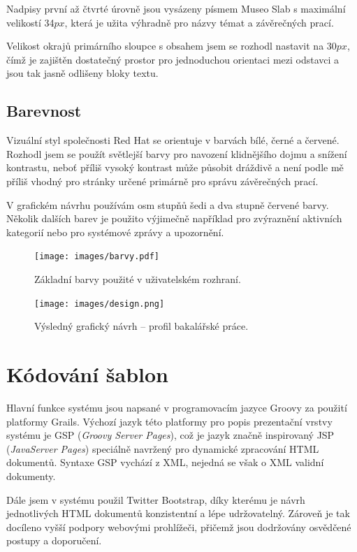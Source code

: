 Nadpisy první až čtvrté úrovně jsou vysázeny písmem Museo Slab s maximální velikostí 34$px$, která je užita výhradně pro názvy témat a závěrečných prací.

Velikost okrajů primárního sloupce s obsahem jsem se rozhodl nastavit na 30$px$, čímž je zajištěn dostatečný prostor pro jednoduchou orientaci mezi odstavci a jsou tak jasně odlišeny bloky textu.

\subsection{Barevnost}

Vizuální styl společnosti Red Hat se orientuje v barvách bílé, černé a červené. Rozhodl jsem se použít světlejší barvy pro navození klidnějšího dojmu a snížení kontrastu, neboť příliš vysoký kontrast může působit dráždivě a není podle mě příliš vhodný pro stránky určené primárně pro správu závěrečných prací.

V grafickém návrhu používám osm stupňů šedi a dva stupně červené barvy. Několik dalších barev je použito výjimečně například pro zvýraznění aktivních kategorií nebo pro systémové zprávy a upozornění.

\begin{figure}[htbp]
    \centering
    \texttt{[image: images/barvy.pdf]}
    \caption{Základní barvy použité v uživatelském rozhraní.}
    \label{img:colors}
\end{figure}

\begin{figure}[htbp]
    \centering
    \texttt{[image: images/design.png]}
    \caption{Výsledný grafický návrh -- profil bakalářské práce.}
    \label{img:design}
\end{figure}

\section{Kódování šablon}

Hlavní funkce systému jsou napsané v programovacím jazyce Groovy za použití platformy Grails. Výchozí jazyk této platformy pro popis prezentační vrstvy systému je GSP (\textit{Groovy Server Pages}), což je jazyk značně inspirovaný JSP (\textit{JavaServer Pages}) speciálně navržený pro dynamické zpracování HTML dokumentů. Syntaxe GSP vychází z XML, nejedná se však o XML validní dokumenty.

Dále jsem v systému použil Twitter Bootstrap, díky kterému je návrh jednotlivých HTML dokumentů konzistentní a lépe udržovatelný. Zároveň je tak docíleno vyšší podpory webovými prohlížeči, přičemž jsou dodržovány osvědčené postupy a doporučení.

